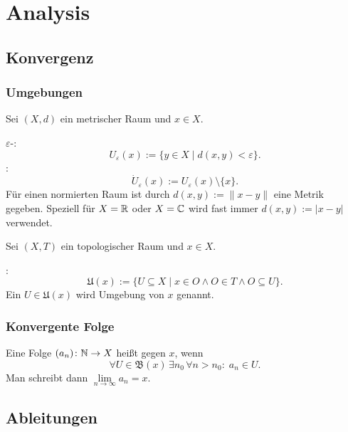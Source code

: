 
\chapter{Analysis}
\section{Konvergenz}
\subsection{Umgebungen}
Sei $(X,d)$ ein metrischer Raum und $x\in X$.

\noindent
{} $\varepsilon$-:
\begin{equation}
U_\varepsilon(x) := \{y\in X\mid d(x,y)<\varepsilon\}.
\end{equation}
:
\begin{equation}
\dot U_\varepsilon(x) := U_\varepsilon(x)\setminus\{x\}.
\end{equation}
Für einen normierten Raum ist durch $d(x,y):=\|x-y\|$ eine
Metrik gegeben. Speziell für $X=\mathbb R$ oder $X=\mathbb C$ wird fast immer
$d(x,y):=|x-y|$ verwendet.

Sei $(X,T)$ ein topologischer Raum und $x\in X$.

\noindent
{} :
\begin{equation}
\mathfrak U(x) := \{U\subseteq X\mid x\in O\land O\in T
\land O\subseteq U\}.
\end{equation}
Ein $U\in\mathfrak U(x)$ wird Umgebung von $x$ genannt.

\subsection{Konvergente Folge}
Eine Folge $(a_n)\colon \mathbb N\to X$ heißt  gegen $x$, wenn%
\begin{equation}
\forall U{\in}\mathfrak B(x)\,\exists n_0\,\forall n{>}n_0\colon\;
a_n\in U.
\end{equation}
Man schreibt dann $\lim\limits_{n\to\infty} a_n=x$.

\section{Ableitungen}
